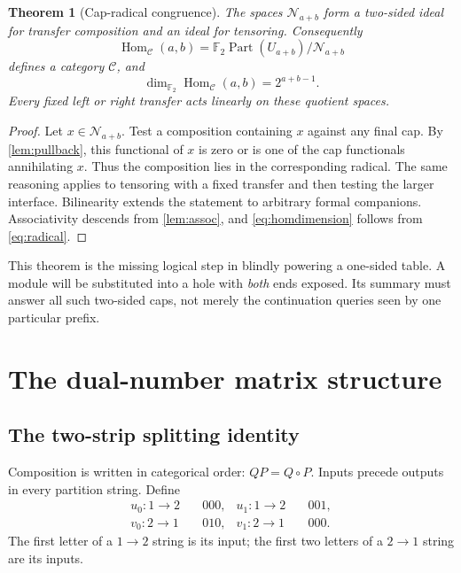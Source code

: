 \documentclass[11pt,a4paper]{article}
\newtheorem{theorem}{Theorem}[section]
\theoremstyle{definition}
\newcommand{\F}{\mathbb F_2}
\newcommand{\Part}{\operatorname{Part}}
\newcommand{\Hom}{\operatorname{Hom}}
\begin{document}
\begin{theorem}[Cap-radical congruence]\label{thm:ideal}
The spaces $\mathcal N_{a+b}$ form a two-sided ideal for transfer composition and an ideal for tensoring. Consequently
\[
\Hom_{\mathcal C}(a,b)=\F\Part(U_{a+b})/\mathcal N_{a+b}
\]
defines a category $\mathcal C$, and
\begin{equation}
\dim_{\F}\Hom_{\mathcal C}(a,b)=2^{a+b-1}.
\label{eq:homdimension}
\end{equation}
Every fixed left or right transfer acts linearly on these quotient spaces.
\end{theorem}
\begin{proof}
Let $x\in\mathcal N_{a+b}$. Test a composition containing $x$ against any final cap. By \cref{lem:pullback}, this functional of $x$ is zero or is one of the cap functionals annihilating $x$. Thus the composition lies in the corresponding radical. The same reasoning applies to tensoring with a fixed transfer and then testing the larger interface. Bilinearity extends the statement to arbitrary formal companions. Associativity descends from \cref{lem:assoc}, and \eqref{eq:homdimension} follows from \eqref{eq:radical}.
\end{proof}

This theorem is the missing logical step in blindly powering a one-sided table. A module will be substituted into a hole with \emph{both} ends exposed. Its summary must answer all such two-sided caps, not merely the continuation queries seen by one particular prefix.

\section{The dual-number matrix structure}\label{sec:algebra}

\subsection{The two-strip splitting identity}
Composition is written in categorical order: $QP=Q\circ P$. Inputs precede outputs in every partition string. Define
\begin{align*}
u_0:1\to2&\quad 000, &u_1:1\to2&\quad 001,\\
v_0:2\to1&\quad 010, &v_1:2\to1&\quad 000.
\end{align*}
The first letter of a $1\to2$ string is its input; the first two letters of a $2\to1$ string are its inputs.
\end{document}
